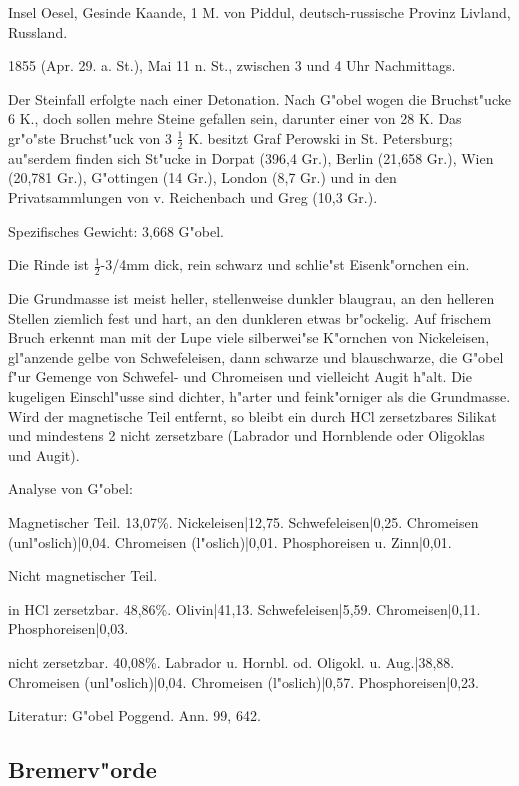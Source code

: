 \documentclass[a4paper, 11pt, oneside]{article}
\begin{document}
Insel Oesel, Gesinde Kaande, 1 M. von Piddul, deutsch-russische Provinz Livland, Russland.

1855 (Apr. 29. a. St.), Mai 11 n. St., zwischen 3 und 4 Uhr Nachmittags.

Der Steinfall erfolgte nach einer Detonation. Nach G"obel wogen die Bruchst"ucke 6 K., doch sollen mehre Steine gefallen sein, darunter einer von 28 K. Das gr"o"ste Bruchst"uck von 3 $\frac{1}{2}$ K. besitzt Graf Perowski in St. Petersburg; au"serdem finden sich St"ucke in Dorpat (396,4 Gr.), Berlin (21,658 Gr.), Wien (20,781 Gr.), G"ottingen (14 Gr.), London (8,7 Gr.) und in den Privatsammlungen von v. Reichenbach und Greg (10,3 Gr.).

Spezifisches Gewicht: 3,668 G"obel.

Die Rinde ist $\frac{1}{2}$-3/4mm dick, rein schwarz und schlie"st Eisenk"ornchen ein.

Die Grundmasse ist meist heller, stellenweise dunkler blaugrau, an den helleren Stellen ziemlich fest und hart, an den dunkleren etwas br"ockelig. Auf frischem Bruch erkennt man mit der Lupe viele silberwei"se K"ornchen von Nickeleisen, gl"anzende gelbe von Schwefeleisen, dann schwarze und blauschwarze, die G"obel f"ur Gemenge von Schwefel- und Chromeisen und vielleicht Augit h"alt. Die kugeligen Einschl"usse sind dichter, h"arter und feink"orniger als die Grundmasse. Wird der magnetische Teil entfernt, so bleibt ein durch HCl zersetzbares Silikat und mindestens 2 nicht zersetzbare (Labrador und Hornblende oder Oligoklas und Augit).

Analyse von G"obel:

Magnetischer Teil. 13,07\%.  
Nickeleisen|12,75.  
Schwefeleisen|0,25.  
Chromeisen (unl"oslich)|0,04.  
Chromeisen (l"oslich)|0,01.  
Phosphoreisen u. Zinn|0,01.

Nicht magnetischer Teil.

in HCl zersetzbar. 48,86\%.  
Olivin|41,13.  
Schwefeleisen|5,59.  
Chromeisen|0,11.  
Phosphoreisen|0,03.

nicht zersetzbar. 40,08\%.  
Labrador u. Hornbl. od. Oligokl. u. Aug.|38,88.  
Chromeisen (unl"oslich)|0,04.  
Chromeisen (l"oslich)|0,57.  
Phosphoreisen|0,23.  

Literatur: G"obel Poggend. Ann. 99, 642.

\subsection{Bremerv"orde}
\end{document}

